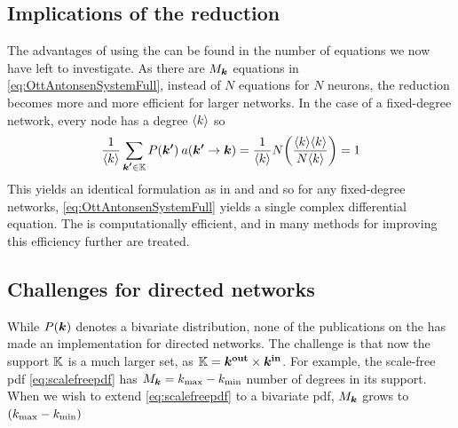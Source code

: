 \subsection{Implications of the reduction}
The advantages of using the \MFR can be found in the number of equations we now have left to investigate. As there are $M_{{\boldsymbol{k}}}$ equations in \eqref{eq:OttAntonsenSystemFull}, instead of $N$ equations for $N$ neurons, the reduction becomes more and more efficient for larger networks. In the case of a fixed-degree network, every node has a degree ${\langle k\rangle}$ so 
\begin{align*}
    \frac{1}{\kmean} \sum_{\kacc \in \K} P\left(\kacc\right) \: a\left(\kacc \rightarrow \k\right) = \frac{1}{\kmean} N \left( \frac{\kmean \kmean}{N \kmean} \right) = 1
\end{align*}
This yields an identical formulation as in \cite{Luke2013} and \cite{Martens2020} and so for any fixed-degree networks, \eqref{eq:OttAntonsenSystemFull} yields a single complex differential equation. The \MFR is computationally efficient, and in \cite{OttAntonsen2017} many methods for improving this efficiency further are treated.


\subsection{Challenges for directed networks}
While $P({\boldsymbol{k}})$ denotes a bivariate distribution, none of the publications on the \MFR has made an implementation for directed networks. The challenge is that now the support ${\mathbb{K}}$ is a much larger set, as ${\mathbb{K}} = \boldsymbol{{k^{\rm out}}} \times {\boldsymbol{k^{\rm in}}}$. For example, the scale-free pdf \eqref{eq:scalefreepdf} has $M_{{\boldsymbol{k}}} = k_{\text{max}} - k_{\text{min}}$ number of degrees in its support. When we wish to extend \eqref{eq:scalefreepdf} to a bivariate pdf, $M_{{\boldsymbol{k}}}$ grows to $\left( \kmax - \kmin \right)$

